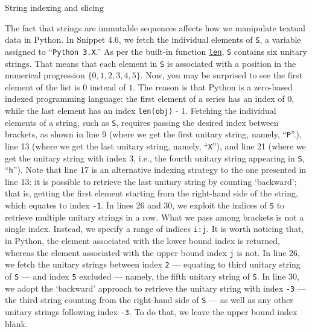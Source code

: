 \documentclass[a4paper,11pt]{book}
\numberwithin{figure}{chapter}
\numberwithin{table}{chapter}
\newcommand{\question}[1]{%
    \begin{tcolorbox}[colback=comp_c!10,colframe=comp_c,sidebyside align=top,width=\linewidth,before skip=1ex]
        #1
    \end{tcolorbox}
    \switchcolumn%
}
\newcommand{\note}[1]{%
    \begin{tcolorbox}[colback=white!0,colframe=white!10,width=\linewidth,before skip=1ex]
        #1
    \end{tcolorbox}
}
\begin{document}
\begin{paracol}{2}
	\question{String indexing and slicing}
	\note{The fact that strings are immutable sequences affects how we manipulate textual data in Python. In Snippet 4.6, we fetch the individual elements of \texttt{S}, a variable assigned to ``\texttt{Python 3.X}.'' As per the built-in function \href{https://docs.python.org/3/tutorial/introduction.html\#strings}{\texttt{len}}, \texttt{S} contains six unitary strings. That means that each element in \texttt{S} is associated with a position in the numerical progression $\{0, 1, 2, 3, 4, 5\}$. Now, you may be surprised to see the first element of the list is $0$ instead of $1$. The reason is that Python is a zero-based indexed programming language: the first element of a series has an index of $0$, while the last element has an index \texttt{len(obj)} - 1.  Fetching the individual elements of a string, such as \texttt{S}, requires passing the desired index between brackets, as shown in line 9 (where we get the first unitary string, namely, ``\texttt{P}''.), line 13 (where we get the last unitary string, namely, ``\texttt{X}''), and line 21 (where we get the unitary string with index $3$, i.e., the fourth unitary string appearing in \texttt{S}, ``\texttt{h}''). Note that line 17 is an alternative indexing strategy to the one presented in line 13: it is possible to retrieve the last unitary string by counting `backward'; that is, getting the first element starting from the right-hand side of the string, which equates to index \texttt{-1}. In lines 26 and 30, we exploit the indices of \texttt{S} to retrieve multiple unitary strings in a row. What we pass among brackets is not a single index. Instead, we specify a range of indices \texttt{i:j}. It is worth noticing that, in Python, the element associated with the lower bound index \texttt{} is returned, whereas the element associated with the upper bound index \texttt{j} is not. In line 26, we fetch the unitary strings between index \texttt{2} --- equating to third unitary string of \texttt{S} --- and index \texttt{5} excluded --- namely, the fifth unitary string of \texttt{S}. In line 30, we adopt the `backward' approach to retrieve the unitary string with index \texttt{-3} --- the third string counting from the right-hand side of \texttt{S} --- as well as any other unitary strings following index \texttt{-3}. To do that, we leave the upper bound index blank.} 
\end{paracol}
\clearpage
\end{document}
